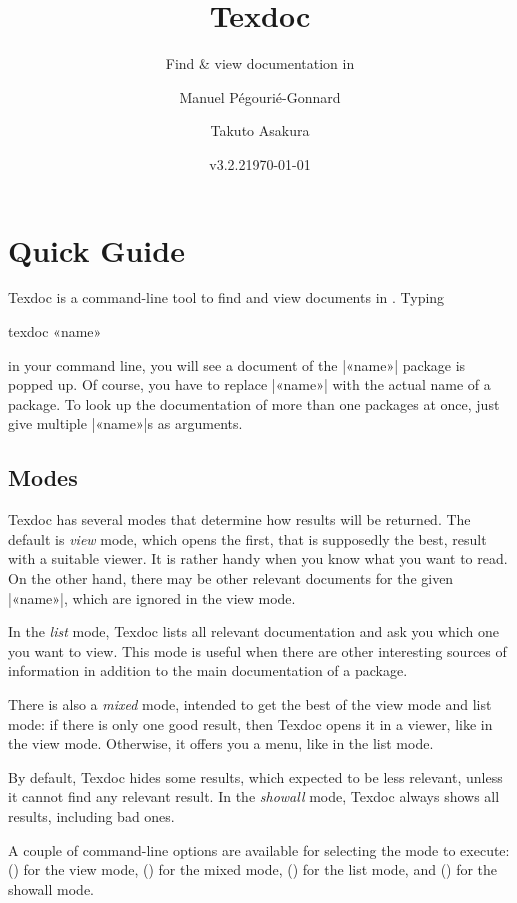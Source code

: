 \documentclass{texdoc-doc}
\title{Texdoc}
\subtitle{Find \& view documentation in \TL}
\author{Manuel Pégourié-Gonnard\and Takuto Asakura}
\date{v3.2.2\quad \today}
\begin{document}
\VerbatimFootnotes

\maketitle

\section{Quick Guide}

Texdoc is a command-line tool to find and view documents in {\TL}. Typing
%
\begin{htcode}
texdoc «name»
\end{htcode}
%
in your command line, you will see a document of the |«name»| package is popped
up. Of course, you have to replace |«name»| with the actual name of a package.
To look up the documentation of more than one packages at once, just give
multiple |«name»|s as arguments.

\subsection{Modes}
\label{sec:modes}

Texdoc has several modes that determine how results will be returned. The
default is \emph{view} mode, which opens the first, that is supposedly the
best, result with a suitable viewer. It is rather handy when you know what you
want to read. On the other hand, there may be other relevant documents for the
given |«name»|, which are ignored in the view mode.

In the \emph{list} mode, Texdoc lists all relevant documentation and ask you
which one you want to view. This mode is useful when there are other
interesting sources of information in addition to the main documentation of a
package.

There is also a \emph{mixed} mode, intended to get the best of the view mode
and list mode: if there is only one good result, then Texdoc opens it in a
viewer, like in the view mode. Otherwise, it offers you a menu, like in the
list mode.

By default, Texdoc hides some results, which expected to be less relevant,
unless it cannot find any relevant result. In the \emph{showall} mode, Texdoc
always shows all results, including bad ones.

A couple of command-line options are available for selecting the mode to
execute:  () for the view mode,  () for
the mixed mode,  () for the list mode, and 
() for the showall mode.
\end{document}
